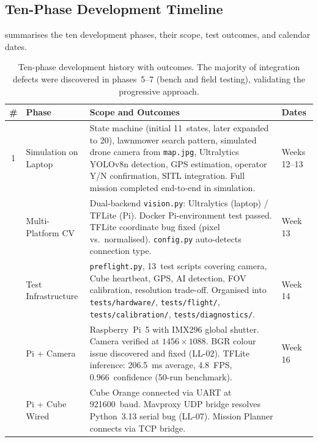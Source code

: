 \subsection{Ten-Phase Development Timeline}\label{sec:dev-timeline}

 summarises the ten development phases, their
scope, test outcomes, and calendar dates.

\begin{table}[H]
\centering
\compactTable
\caption{Ten-phase development history with outcomes.  The majority of integration defects were discovered in phases~5--7 (bench and field testing), validating the progressive approach.}
\label{tab:dev-phases}
\begin{tabularx}{\linewidth}{@{}c l X l@{}}
\toprule
\textbf{\#} & \textbf{Phase} & \textbf{Scope and Outcomes} & \textbf{Dates} \\
\midrule
1 & Simulation on Laptop &
    State machine (initial 11~states, later expanded to 20), lawnmower search pattern,
    simulated drone camera from \texttt{map.jpg}, Ultralytics YOLOv8n
    detection, GPS estimation, operator Y/N confirmation, SITL
    integration.  Full mission completed end-to-end in simulation. &
    Weeks 12--13 \\
\addlinespace
2 & Multi-Platform CV &
    Dual-backend \texttt{vision.py}: Ultralytics (laptop) / TFLite
    (Pi).  Docker Pi-environment test passed.  TFLite coordinate bug
    fixed (pixel vs.\ normalised).  \texttt{config.py} auto-detects
    connection type. &
    Week 13 \\
\addlinespace
3 & Test Infrastructure &
    \texttt{preflight.py}, 13~test scripts covering camera, Cube
    heartbeat, GPS, AI detection, FOV calibration, resolution trade-off.
    Organised into \texttt{tests/hardware/}, \texttt{tests/flight/},
    \texttt{tests/calibration/}, \texttt{tests/diagnostics/}. &
    Week 14 \\
\addlinespace
4 & Pi + Camera &
    Raspberry~Pi~5 with IMX296 global shutter.  Camera verified at
    $1456\times1088$.  BGR colour issue discovered and fixed (LL-02).
    TFLite inference: \SI{206.5}{\milli\second} average, 4.8~FPS,
    0.966~confidence (50-run benchmark). &
    Week 16 \\
\addlinespace
5 & Pi + Cube Wired &
    Cube Orange connected via UART at \SI{921600}{baud}.  Mavproxy
    UDP bridge resolves Python~3.13 serial bug (LL-07).  Mission
    Planner connects via TCP bridge. &

\end{tabularx}
\end{table}
